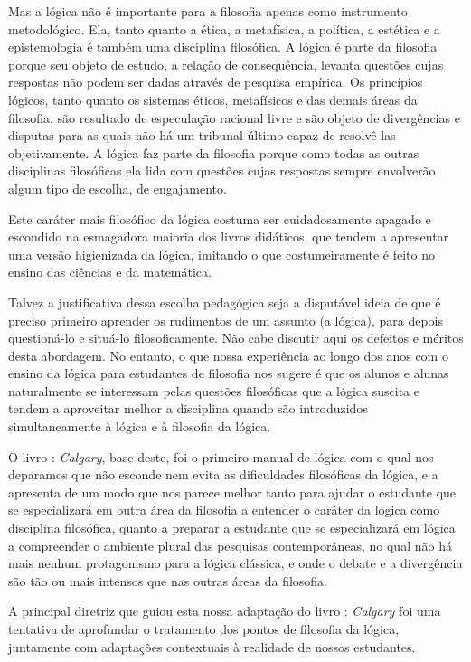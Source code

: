 Mas a lógica não é importante para a filosofia apenas como instrumento metodológico.
Ela, tanto quanto a ética, a metafísica, a política, a estética e a epistemologia é também uma disciplina filosófica.
A lógica é parte da filosofia porque seu objeto de estudo, a relação de consequência, levanta questões cujas respostas não podem ser dadas através de pesquisa empírica.
Os princípios lógicos, tanto quanto os sistemas éticos, metafísicos e das demais áreas da filosofia, são resultado de especulação racional livre e são objeto de divergências e disputas para as quais não há um tribunal último capaz de resolvê-las objetivamente.
A lógica faz parte da filosofia porque como todas as outras disciplinas filosóficas ela lida com questões cujas respostas sempre envolverão algum tipo de escolha, de engajamento.

Este caráter mais filosófico da lógica costuma ser cuidadosamente apagado e escondido na esmagadora maioria dos livros didáticos, que tendem a apresentar uma versão higienizada da lógica, imitando o que costumeiramente é feito no ensino das ciências e da matemática.

Talvez a justificativa dessa escolha pedagógica seja a disputável ideia de que é preciso  primeiro aprender os rudimentos de um assunto (a lógica), para depois questioná-lo e situá-lo filosoficamente.
Não cabe discutir aqui os defeitos e méritos desta abordagem. 
No entanto, o que nossa experiência ao longo dos anos com o ensino da lógica para estudantes de filosofia nos sugere é que os alunos e alunas naturalmente se interessam pelas questões filosóficas que a lógica suscita e tendem a aproveitar melhor a disciplina quando são introduzidos simultaneamente à lógica e à filosofia da lógica.

O livro \forallx: \emph{Calgary}, base deste, foi o primeiro manual de lógica com o qual nos deparamos que não esconde nem evita as dificuldades filosóficas da lógica, e a apresenta de um modo que nos parece melhor tanto para ajudar o estudante que se especializará em outra área da filosofia a entender o caráter da lógica como disciplina filosófica, quanto a preparar a estudante que se especializará em lógica a compreender o ambiente plural das pesquisas contemporâneas, no qual não há mais nenhum protagonismo para a lógica clássica, e onde o debate e a divergência são tão ou mais intensos que nas outras áreas da filosofia.

A principal diretriz que guiou esta nossa adaptação do livro \forallx: \emph{Calgary} foi uma tentativa de aprofundar o tratamento dos pontos de filosofia da lógica, juntamente com adaptações contextuais à realidade de nossos estudantes.


